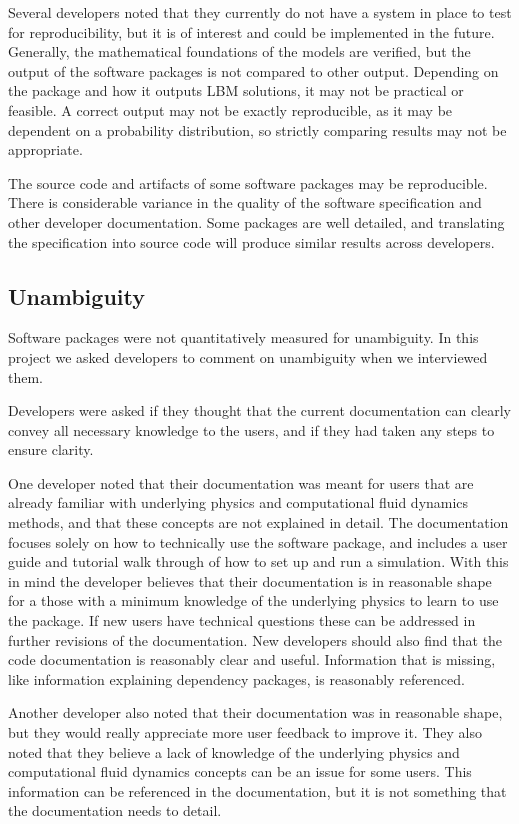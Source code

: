 \documentclass[12pt, notitlepage]{article}
\begin{document}
Several developers noted that they currently do not have a system in place to test for reproducibility, but it is of interest and could be implemented in the future. Generally, the mathematical foundations of the models are verified, but the output of the software packages is not compared to other output. Depending on the package and how it outputs LBM solutions, it may not be practical or feasible. A correct output may not be exactly reproducible, as it may be dependent on a probability distribution, so strictly comparing results may not be appropriate. 

The source code and artifacts of some software packages may be reproducible. There is considerable variance in the quality of the software specification and other developer documentation. Some packages are well detailed, and translating the specification into source code will produce similar results across developers. 

\subsection{Unambiguity}

Software packages were not quantitatively measured for unambiguity.
In this project we asked developers to comment on unambiguity when we interviewed them.

Developers were asked if they thought that the current documentation can clearly convey all necessary knowledge to the users, and if they had taken any steps to ensure clarity. 

One developer noted that their documentation was meant for users that are already familiar with underlying physics and computational fluid dynamics methods, and that these concepts are not explained in detail. The documentation focuses solely on how to technically use the software package, and includes a user guide and tutorial walk through of how to set up and run a simulation. With this in mind the developer believes that their documentation is in reasonable shape for a those with a minimum knowledge of the underlying physics to learn to use the package. If new users have technical questions these can be addressed in further revisions of the documentation. New developers should also find that the code documentation is reasonably clear and useful. Information that is missing, like information explaining dependency packages, is reasonably referenced. 

Another developer also noted that their documentation was in reasonable shape, but they would really appreciate more user feedback to improve it. They also noted that they believe a lack of knowledge of the underlying physics and computational fluid dynamics concepts can be an issue for some users. This information can be referenced in the documentation, but it is not something that the documentation needs to detail. 
\end{document}
